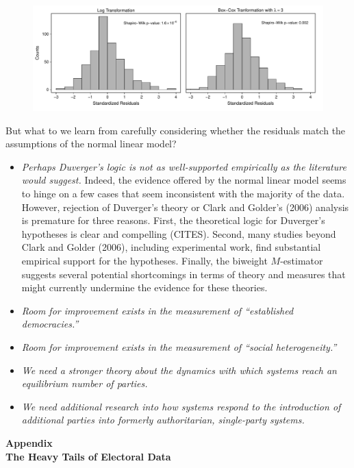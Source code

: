 \documentclass[12pt]{article}
\begin{document}
\begin{figure}[h!]
\begin{center}
\includegraphics[width = \textwidth]{figs/cg-trans-residuals-hist.pdf}
\caption{}\label{fig:cg-trans-residuals-hist}
\end{center}
\end{figure}

But what to we learn from carefully considering whether the residuals match the assumptions of the normal linear model?
\begin{itemize}
\item \textit{Perhaps Duverger's logic is not as well-supported empirically as the literature would suggest.} Indeed, the evidence offered by the normal linear model seems to hinge on a few cases that seem inconsistent with the majority of the data. However, rejection of Duverger's theory or Clark and Golder's (2006) analysis is premature for three reasons. First, the theoretical logic for Duverger's hypotheses is clear and compelling (CITES). Second, many studies beyond Clark and Golder (2006), including experimental work, find substantial empirical support for the hypotheses. Finally, the biweight $M$-estimator suggests several potential shortcomings in terms of theory and measures that might currently undermine the evidence for these theories.
\item \textit{Room for improvement exists in the measurement of ``established democracies.''}
\item \textit{Room for improvement exists in the measurement of ``social heterogeneity.''}
\item \textit{We need a stronger theory about the dynamics with which systems reach an equilibrium number of parties.}
\item \textit{We need additional research into how systems respond to the introduction of additional parties into formerly authoritarian, single-party systems.}
\end{itemize}

\newpage
\doublespace
\begin{appendix}
\begin{center}
\textbf{{\LARGE Appendix}}\\\vspace{2mm}
\textbf{{\large The Heavy Tails of Electoral Data}}\\\vspace{2mm}

\end{center}
\section{}


\end{appendix}
\end{document}
